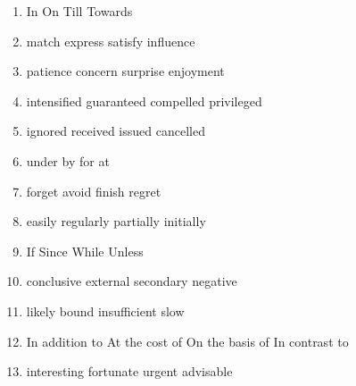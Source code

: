 \newpage
\begin{enumerate}
\item


\fourchoices
{In}
{On}
{Till}
{Towards}

\item


\fourchoices
{match}
{express}
{satisfy}
{influence}

\item


\fourchoices
{patience}
{concern}
{surprise}
{enjoyment}

\item

\fourchoices
{intensified}
{guaranteed}
{compelled}
{privileged}

\item


\fourchoices
{ignored}
{received}
{issued}
{cancelled}


\item


\fourchoices
{under}
{by}
{for}
{at}

\item


\fourchoices
{forget}
{avoid}
{finish}
{regret}

\item


\fourchoices
{easily}
{regularly}
{partially}
{initially}

\item


\fourchoices
{If}
{Since}
{While}
{Unless}



\item

\fourchoices
{conclusive}
{external}
{secondary}
{negative}



\item


\fourchoices
{likely}
{bound}
{insufficient}
{slow}




\item

\fourchoices
{In addition to}
{At the cost of}
{On the basis of}
{In contrast to}



\item

\fourchoices
{interesting}
{fortunate}
{urgent}
{advisable}




\end{enumerate}

